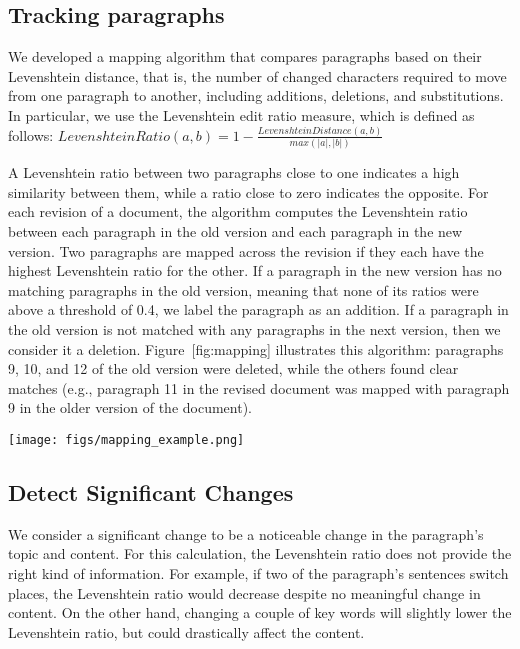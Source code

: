 \subsection{Tracking paragraphs}\label{tracking-paragraphs}

We developed a mapping algorithm that compares paragraphs based on their
Levenshtein distance, that is, the number of changed characters required
to move from one paragraph to another, including additions, deletions,
and substitutions. In particular, we use the Levenshtein edit ratio
measure, which is defined as follows:
\(Levenshtein Ratio(a,b) = 1-\frac{Levenshtein Distance(a,b)}{max(|a|,|b|)} \)

A Levenshtein ratio between two paragraphs close to one indicates a high
similarity between them, while a ratio close to zero indicates the
opposite. For each revision of a document, the algorithm computes the
Levenshtein ratio between each paragraph in the old version and each
paragraph in the new version. Two paragraphs are mapped across the
revision if they each have the highest Levenshtein ratio for the other.
If a paragraph in the new version has no matching paragraphs in the old
version, meaning that none of its ratios were above a threshold of 0.4,
we label the paragraph as an addition. If a paragraph in the old version
is not matched with any paragraphs in the next version, then we consider
it a deletion. Figure~{[}fig:mapping{]} illustrates this algorithm:
paragraphs 9, 10, and 12 of the old version were deleted, while the
others found clear matches (e.g., paragraph 11 in the revised document
was mapped with paragraph 9 in the older version of the document).

\texttt{[image: figs/mapping\_example.png]}\\

\subsection{Detect Significant
Changes}\label{detect-significant-changes}

We consider a significant change to be a noticeable change in the
paragraph's topic and content. For this calculation, the Levenshtein
ratio does not provide the right kind of information. For example, if
two of the paragraph's sentences switch places, the Levenshtein ratio
would decrease despite no meaningful change in content. On the other
hand, changing a couple of key words will slightly lower the Levenshtein
ratio, but could drastically affect the content.

